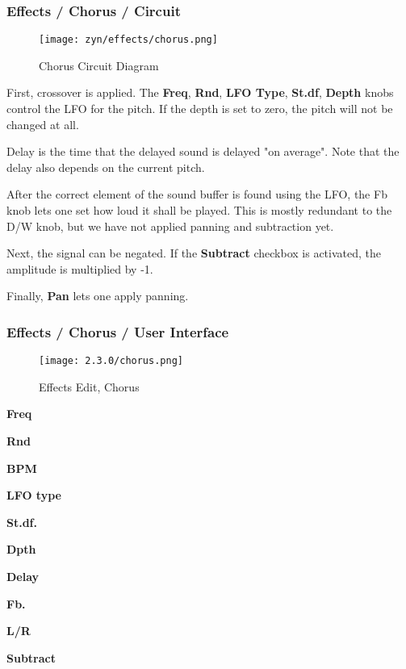 \subsubsection{Effects / Chorus / Circuit}
\label{subsubsec:effects_edit_chorus_circuit}

\begin{figure}[H]
   \centering
   \texttt{[image: zyn/effects/chorus.png]}
   \caption{Chorus Circuit Diagram}
   \label{fig:chorus_circuit_diagram}
\end{figure}

   First, crossover is applied.
   The \textbf{Freq}, \textbf{Rnd}, \textbf{LFO Type}, \textbf{St.df},
   \textbf{Depth} knobs control the LFO
   for the pitch. If the depth is set to zero, the pitch will not be changed
   at all.

   Delay is the time that the delayed sound is delayed "on average". Note
   that the delay also depends on the current pitch.

   After the correct element of the sound buffer is found using the LFO, the
   Fb knob lets one set how loud it shall be played. This is mostly redundant
   to the D/W knob, but we have not applied panning and subtraction yet.

   Next, the signal can be negated. If the \textbf{Subtract}
   checkbox is activated, the amplitude is multiplied by -1.

   Finally, \textbf{Pan} lets one apply panning.

\subsubsection{Effects / Chorus / User Interface}
\label{subsubsec:effects_edit_chorus_ui}

\begin{figure}[H]
   \centering
   \texttt{[image: 2.3.0/chorus.png]}
   \caption{Effects Edit, Chorus}
   \label{fig:effects_edit_chorus}
\end{figure}

   \begin{enumber}
      \item \textbf{Freq}
      \item \textbf{Rnd}
      \item \textbf{BPM}
      \item \textbf{LFO type}
      \item \textbf{St.df.}
      \item \textbf{Dpth}
      \item \textbf{Delay}
      \item \textbf{Fb.}
      \item \textbf{L/R}
      \item \textbf{Subtract}
   \end{enumber}

